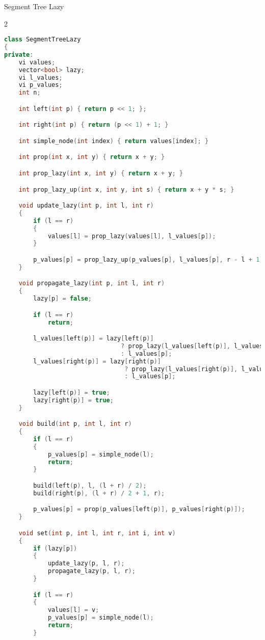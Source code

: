 \documentclass[leter]{amsart}
\begin{document}
Segment Tree Lazy
\begin{multicols}{2}
\begin{lstlisting}[language=C++]
class SegmentTreeLazy
{
private:
    vi values;
    vector<bool> lazy;
    vi l_values;
    vi p_values;
    int n;

    int left(int p) { return p << 1; };

    int right(int p) { return (p << 1) + 1; }

    int simple_node(int index) { return values[index]; }

    int prop(int x, int y) { return x + y; }

    int prop_lazy(int x, int y) { return x + y; }

    int prop_lazy_up(int x, int y, int s) { return x + y * s; }

    void update_lazy(int p, int l, int r)
    {
        if (l == r)
        {
            values[l] = prop_lazy(values[l], l_values[p]);
        }

        p_values[p] = prop_lazy_up(p_values[p], l_values[p], r - l + 1);
    }

    void propagate_lazy(int p, int l, int r)
    {
        lazy[p] = false;

        if (l == r)
            return;

        l_values[left(p)] = lazy[left(p)]
                                ? prop_lazy(l_values[left(p)], l_values[p])
                                : l_values[p];
        l_values[right(p)] = lazy[right(p)]
                                 ? prop_lazy(l_values[right(p)], l_values[p])
                                 : l_values[p];

        lazy[left(p)] = true;
        lazy[right(p)] = true;
    }

    void build(int p, int l, int r)
    {
        if (l == r)
        {
            p_values[p] = simple_node(l);
            return;
        }

        build(left(p), l, (l + r) / 2);
        build(right(p), (l + r) / 2 + 1, r);

        p_values[p] = prop(p_values[left(p)], p_values[right(p)]);
    }

    void set(int p, int l, int r, int i, int v)
    {
        if (lazy[p])
        {
            update_lazy(p, l, r);
            propagate_lazy(p, l, r);
        }

        if (l == r)
        {
            values[l] = v;
            p_values[p] = simple_node(l);
            return;
        }


\end{lstlisting}
\end{multicols}
\end{document}
